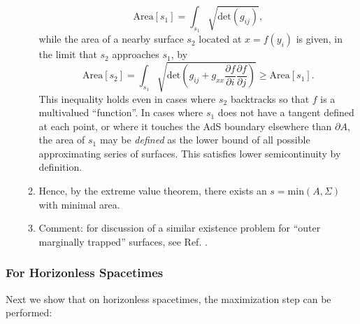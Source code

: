 \documentclass[12pt]{article}
\begin{document}
\begin{enumerate}[resume]
\begin{enumerate}
\begin{equation}
\mathrm{Area}[s_1] = \int_{s_1} \sqrt{\mathrm{det}(g_{ij})},
\end{equation}
while the area of a nearby surface $s_2$ located at $x = f(y_i)$ is given, in the limit that $s_2$ approaches $s_1$, by
\begin{equation}\label{s_2}
\mathrm{Area}[s_2] = \int_{s_1} \sqrt{ \mathrm{det} 
\left( g_{ij} + g_{xx} \frac{\partial f}{\partial i}\frac{\partial f}{\partial j} \right) } \ge \mathrm{Area}[s_1].
\end{equation}
This inequality holds even in cases where $s_2$ backtracks so that $f$ is a multivalued ``function''.  
In cases where $s_1$ does not have a tangent defined at each point, or where it touches the AdS boundary elsewhere than $\partial A$, the area of $s_1$ may be \emph{defined} as the lower bound of all possible approximating series of surfaces.  This satisfies lower semicontinuity by definition.
	\item Hence, by the extreme value theorem, there exists an $s = \mathrm{min}(A,\Sigma)$ with minimal area.
	\item Comment: for discussion of a similar existence problem for ``outer marginally trapped'' surfaces, see Ref. \cite{plat}.
	\end{enumerate}
\end{enumerate}

\subsubsection{For Horizonless Spacetimes}\label{hless}

Next we show that on horizonless spacetimes, the maximization step can be performed:
\end{document}
